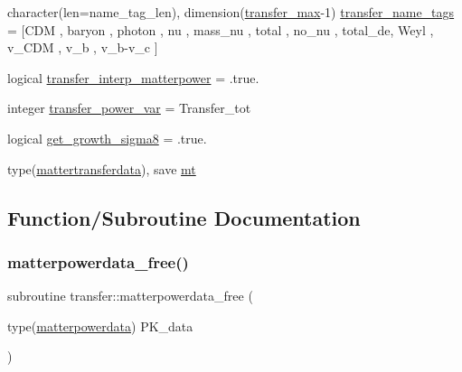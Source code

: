 \begin{DoxyCompactItemize}
character(len=name\+\_\+tag\+\_\+len), dimension(\mbox{\hyperlink{namespacetransfer_ac87f6542d01968f20465ccd32f02667c}{transfer\+\_\+max}}-\/1) \mbox{\hyperlink{namespacetransfer_ac02a42ae84b0dbee0b48ed2dd95b6dc8}{transfer\+\_\+name\+\_\+tags}} = \mbox{[}\textquotesingle{}C\+DM \textquotesingle{}, \textquotesingle{}baryon \textquotesingle{}, \textquotesingle{}photon \textquotesingle{}, \textquotesingle{}nu \textquotesingle{}, \textquotesingle{}mass\+\_\+nu \textquotesingle{}, \textquotesingle{}total \textquotesingle{}, \textquotesingle{}no\+\_\+nu \textquotesingle{}, \textquotesingle{}total\+\_\+de\textquotesingle{}, \textquotesingle{}Weyl \textquotesingle{}, \textquotesingle{}v\+\_\+\+C\+DM \textquotesingle{}, \textquotesingle{}v\+\_\+b \textquotesingle{}, \textquotesingle{}v\+\_\+b-\/v\+\_\+c \textquotesingle{}\mbox{]}
\item 
logical \mbox{\hyperlink{namespacetransfer_a1dfb4e8c94804bd740e5d676a5b23d6f}{transfer\+\_\+interp\+\_\+matterpower}} = .true.
\item 
integer \mbox{\hyperlink{namespacetransfer_abd233741f7f81807122709afee55d2f2}{transfer\+\_\+power\+\_\+var}} = Transfer\+\_\+tot
\item 
logical \mbox{\hyperlink{namespacetransfer_a271d66692c1d4b207c6e033b5a8197e8}{get\+\_\+growth\+\_\+sigma8}} = .true.
\item 
type(\mbox{\hyperlink{structtransfer_1_1mattertransferdata}{mattertransferdata}}), save \mbox{\hyperlink{namespacetransfer_abf8737afeb10e8b167c70416ad103a74}{mt}}
\end{DoxyCompactItemize}


\subsection{Function/\+Subroutine Documentation}
\mbox{\label{namespacetransfer_aca3eef4bfa07144ae4db1ec793e42c70}} 
\subsubsection{\texorpdfstring{matterpowerdata\+\_\+free()}{matterpowerdata\_free()}}
{\footnotesize\ttfamily subroutine transfer\+::matterpowerdata\+\_\+free (\begin{DoxyParamCaption}\item[{type(\mbox{\hyperlink{structtransfer_1_1matterpowerdata}{matterpowerdata}})}]{P\+K\+\_\+data }\end{DoxyParamCaption})}



